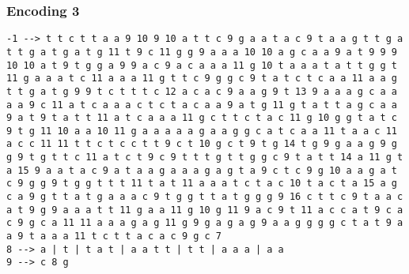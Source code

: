 \subsubsection{Encoding 3}
\begin{verbatim}
-1 --> t t c t t a a 9 10 9 10 a t t c 9 g a a t a c 9 t a a g t t g a t t g a t g a t g 11 t 9 c 11 g g 9 a a a 10 10 a g c a a 9 a t 9 9 9 10 10 a t 9 t g g a 9 9 a c 9 a c a a a 11 g 10 t a a a t a t t g g t 11 g a a a t c 11 a a a 11 g t t c 9 g g c 9 t a t c t c a a 11 a a g t t g a t g 9 9 t c t t t c 12 a c a c 9 a a g 9 t 13 9 a a a g c a a a a 9 c 11 a t c a a a c t c t a c a a 9 a t g 11 g t a t t a g c a a 9 a t 9 t a t t 11 a t c a a a 11 g c t t c t a c 11 g 10 g g t a t c 9 t g 11 10 a a 10 11 g a a a a a g a a g g c a t c a a 11 t a a c 11 a c c 11 11 t t c t c c t t 9 c t 10 g c t 9 t g 14 t g 9 g a a g 9 g g 9 t g t t c 11 a t c t 9 c 9 t t t g t t g g c 9 t a t t 14 a 11 g t a 15 9 a a t a c 9 a t a a g a a a g a g t a 9 c t c 9 g 10 a a g a t c 9 g g 9 t g g t t t 11 t a t 11 a a a t c t a c 10 t a c t a 15 a g c a 9 g t t a t g a a a c 9 t g g t t a t g g g 9 16 c t t c 9 t a a c a t 9 g 9 a a a t t 11 g a a 11 g 10 g 11 9 a c 9 t 11 a c c a t 9 c a c 9 g c a 11 11 a a a g a g 11 g 9 g a g a g 9 a a g g g g c t a t 9 a a 9 t a a a 11 t c t t a c a c 9 g c 7 
8 --> a | t | t a t | a a t t | t t | a a a | a a 
9 --> c 8 g 
\end{verbatim}

